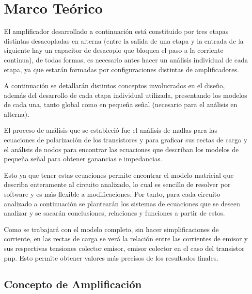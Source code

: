 \section{Marco Teórico}

El amplificador desarrollado a continuación está constituido por tres etapas distintas desacopladas en alterna (entre la salida de una etapa y la entrada de la siguiente hay un capacitor de desacoplo que bloquea el paso a la corriente continua), de todas formas, es necesario antes hacer un análisis individual de cada etapa, ya que estarán formadas por configuraciones distintas de amplificadores.

A continuación se detallarán distintos conceptos involucrados en el diseño, además del desarrollo de cada etapa individual utilizada, presentando los modelos de cada una, tanto global como en pequeña señal (necesario para el análisis en alterna).

El proceso de análisis que se estableció fue el análisis de mallas para las ecuaciones de polarización de los transistores y para graficar sus rectas de carga y el análisis de nodos para encontrar las ecuaciones que describan los modelos de pequeña señal para obtener ganancias e impedancias.

Esto ya que tener estas ecuaciones permite encontrar el modelo matricial que describa enteramente al circuito analizado, lo cual es sencillo de resolver por software y es más flexible a modificaciones. Por tanto, para cada circuito analizado a continuación se plantearán los sistemas de ecuaciones que se deseen analizar y se sacarán conclusiones, relaciones y funciones a partir de estos.

Como se trabajará con el modelo completo, sin hacer simplificaciones de corriente, en las rectas de carga se verá la relación entre las corrientes de emisor y sus respectivas tensiones colector emisor, emisor colector en el caso del transistor pnp. Esto permite obtener valores más precisos de los resultados finales.

\subsection{Concepto de Amplificación}

